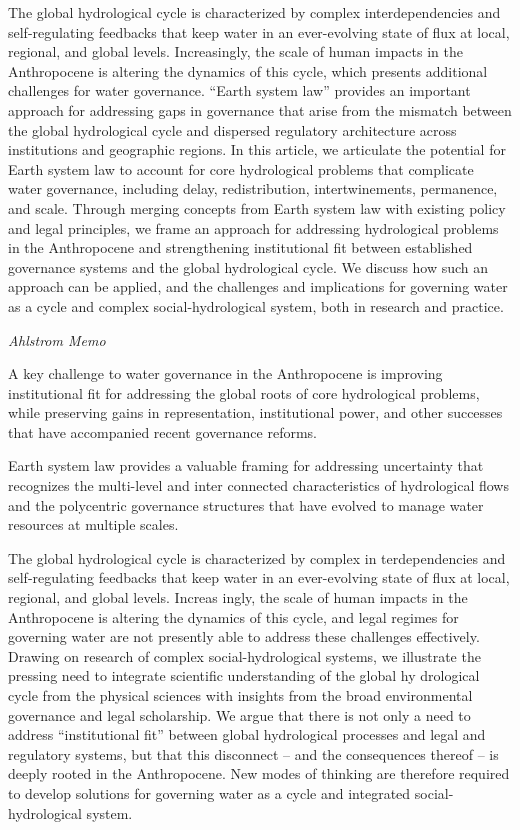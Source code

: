 \documentclass[
]{book}
\begin{document}
The global hydrological cycle is characterized by complex interdependencies and self-regulating feedbacks that keep water in an ever-evolving state of flux at local, regional, and global levels. Increasingly, the scale of human impacts in the Anthropocene is altering the dynamics of this cycle, which presents additional challenges for water governance. ``Earth system law'' provides an important approach for addressing gaps in governance that arise from the mismatch between the global hydrological cycle and dispersed regulatory architecture across institutions and geographic regions. In this article, we articulate the potential for Earth system law to account for core hydrological problems that complicate water governance, including delay, redistribution, intertwinements, permanence, and scale. Through merging concepts from Earth system law with existing policy and legal principles, we frame an approach for addressing hydrological problems in the Anthropocene and strengthening institutional fit between established governance systems and the global hydrological cycle. We discuss how such an approach can be applied, and the challenges and implications for governing water as a cycle and complex social-hydrological system, both in research and practice.

\emph{Ahlstrom Memo}

A key challenge to water governance
in the Anthropocene is improving institutional fit for addressing the
global roots of core hydrological problems, while preserving gains in
representation, institutional power, and other successes that have
accompanied recent governance reforms.

Earth system law provides a valuable framing for
addressing uncertainty that recognizes the multi-level and inter­
connected characteristics of hydrological flows and the polycentric
governance structures that have evolved to manage water resources at
multiple scales.

The global hydrological cycle is characterized by complex in­
terdependencies and self-regulating feedbacks that keep water in an
ever-evolving state of flux at local, regional, and global levels. Increas­
ingly, the scale of human impacts in the Anthropocene is altering the
dynamics of this cycle, and legal regimes for governing water are not
presently able to address these challenges effectively. Drawing on
research of complex social-hydrological systems, we illustrate the
pressing need to integrate scientific understanding of the global hy­
drological cycle from the physical sciences with insights from the broad
environmental governance and legal scholarship. We argue that there is
not only a need to address ``institutional fit'' between global hydrological
processes and legal and regulatory systems, but that this disconnect --
and the consequences thereof -- is deeply rooted in the Anthropocene.
New modes of thinking are therefore required to develop solutions for
governing water as a cycle and integrated social-hydrological system.
\end{document}
